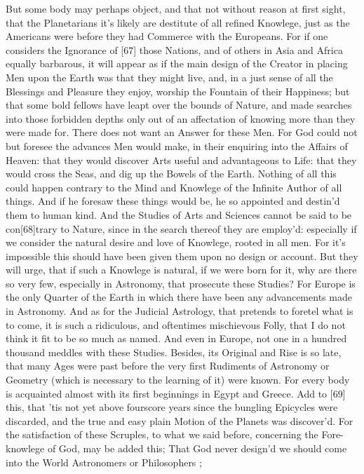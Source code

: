 \documentclass[letterpaper]{book}
\begin{document}
But some body may perhaps object, and that not without reason at first
sight, that the Planetarians it's likely are destitute of all refined
Knowlege, just as the Americans were before they had Commerce with the
Europeans.  For if one considers the Ignorance of [67] those Nations, and of
others in Asia and Africa equally barbarous, it will appear as if the main
design of the Creator in placing Men upon the Earth was that they might
live, and, in a just sense of all the Blessings and Pleasure they enjoy,
worship the Fountain of their Happiness; but that some bold fellows have
leapt over the bounds of Nature, and made searches into those forbidden
depths only out of an affectation of knowing more than they were made for.
There does not want an Answer for these Men. For God could not but foresee
the advances Men would make, in their enquiring into the Affairs of Heaven:
that they would discover Arts useful and advantageous to Life: that they
would cross the Seas, and dig up the Bowels of the Earth. Nothing of all
this could happen contrary to the Mind and Knowlege of the Infinite Author
of all things. And if he foresaw these things would be, he so appointed and
destin'd them to human kind. And the Studies of Arts and Sciences cannot be
said to be con[68]trary to Nature, since in the search thereof they are
employ'd: especially if we consider the natural desire and love of Knowlege,
rooted in all men. For it's impossible this should have been given them upon
no design or account. But they will urge, that if such a Knowlege is
natural, if we were born for it, why are there so very few, especially in
Astronomy, that prosecute these Studies? For Europe is the only Quarter of
the Earth in which there have been any advancements made in Astronomy. And
as for the Judicial Astrology, that pretends to foretel what is to come, it
is such a ridiculous, and oftentimes mischievous Folly, that I do not think
it fit to be so much as named. And even in Europe, not one in a hundred
thousand meddles with these Studies. Besides, its Original and Rise is so
late, that many Ages were past before the very first Rudiments of Astronomy
or Geometry (which is necessary to the learning of it) were known. For every
body is acquainted almost with its first beginnings in Egypt and Greece.
Add to [69] this, that 'tis not yet above fourscore years since the bungling
Epicycles were discarded, and the true and easy plain Motion of the Planets
was discover'd. For the satisfaction of these Scruples, to what we said
before, concerning the Fore-knowlege of God, may be added this; That God
never design'd we should come into the World Astronomers or Philosophers ;
\end{document}
